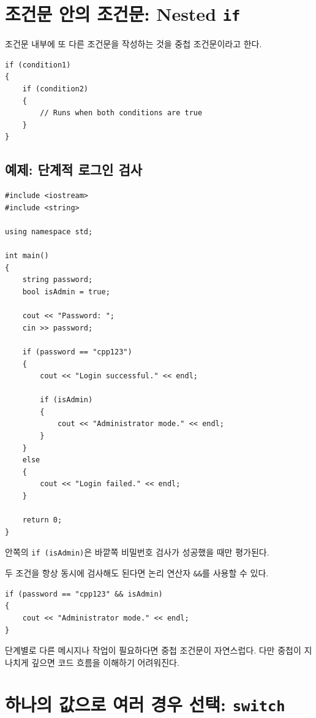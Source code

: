 \documentclass[11pt,a4paper]{article}
\begin{document}
\section{조건문 안의 조건문: Nested \texttt{if}}

조건문 내부에 또 다른 조건문을 작성하는 것을 중첩 조건문이라고 한다.

\begin{lstlisting}
if (condition1)
{
    if (condition2)
    {
        // Runs when both conditions are true
    }
}
\end{lstlisting}

\subsection{예제: 단계적 로그인 검사}

\begin{lstlisting}
#include <iostream>
#include <string>

using namespace std;

int main()
{
    string password;
    bool isAdmin = true;

    cout << "Password: ";
    cin >> password;

    if (password == "cpp123")
    {
        cout << "Login successful." << endl;

        if (isAdmin)
        {
            cout << "Administrator mode." << endl;
        }
    }
    else
    {
        cout << "Login failed." << endl;
    }

    return 0;
}
\end{lstlisting}

안쪽의 \texttt{if (isAdmin)}은 바깥쪽 비밀번호 검사가 성공했을 때만 평가된다.

두 조건을 항상 동시에 검사해도 된다면 논리 연산자 \texttt{\&\&}를 사용할 수 있다.

\begin{lstlisting}
if (password == "cpp123" && isAdmin)
{
    cout << "Administrator mode." << endl;
}
\end{lstlisting}

단계별로 다른 메시지나 작업이 필요하다면 중첩 조건문이 자연스럽다.
다만 중첩이 지나치게 깊으면 코드 흐름을 이해하기 어려워진다.

\section{하나의 값으로 여러 경우 선택: \texttt{switch}}
\end{document}

